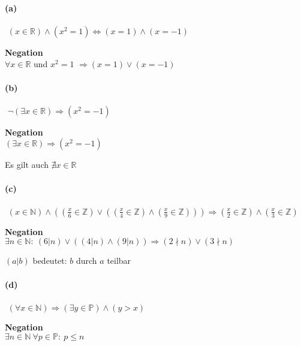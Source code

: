\paragraph{(a)}
\begin{solution}
$ $\newline
$(x\in\mathbb{R})\wedge(x^2=1)\Leftrightarrow (x=1)\wedge(x=-1)$
\end{solution}
\textbf{Negation}\\
$\forall x\in\mathbb{R}$ und $x^2=1$ $\Rightarrow(x=1)\vee(x=-1)$

\paragraph{(b)}
\begin{solution}
$ $\newline
$\neg(\exists x\in\mathbb{R})\Rightarrow(x^2=-1)$
\end{solution}
\textbf{Negation}\\
$(\exists x\in\mathbb{R})\Rightarrow(x^2=-1)$
\begin{remark}
Es gilt auch $\nexists x\in\mathbb{R}$
\end{remark}

\paragraph{(c)}
\begin{solution}
$ $\newline
$(x\in\mathbb{N})\wedge((\frac{x}{6}\in\mathbb{Z})\vee((\frac{x}{4}\in\mathbb{Z})\wedge(\frac{x}{9}\in\mathbb{Z})))\Rightarrow(\frac{x}{2}\in\mathbb{Z})\wedge(\frac{x}{3}\in\mathbb{Z})$
\end{solution}
\textbf{Negation}\\
$\exists n\in\mathbb{N}:\ (6|n)\vee((4|n)\wedge(9|n))\Rightarrow(2\nmid n)\vee(3\nmid n)$
\begin{remark}
$(a|b)$ bedeutet: $b$ durch $a$ teilbar
\end{remark}

\paragraph{(d)}
\begin{solution}
$ $\newline
$(\forall x\in\mathbb{N})\Rightarrow(\exists y\in\mathbb{P})\wedge(y>x)$
\end{solution}
\textbf{Negation}\\
$\exists n\in\mathbb{N}\ \forall p\in\mathbb{P}:\ p\leq n$

